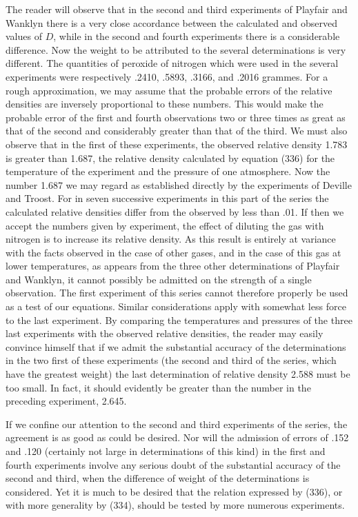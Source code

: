 \documentclass[12pt]{article}
\begin{document}
The reader will observe that in the second and third experiments of Playfair and Wanklyn there is a very close accordance between the calculated and observed values of $D$, while in the second and fourth experiments there is a considerable difference. Now the weight to be attributed to the several determinations is very different. The quantities of peroxide of nitrogen which were used in the several experiments were respectively .2410, .5893, .3166, and .2016 grammes. For a rough approximation, we may assume that the probable errors of the relative densities are inversely proportional to these numbers. This would make the probable error of the first and fourth observations two or three times as great as that of the second and considerably greater than that of the third. We must also observe that in the first of these experiments, the observed relative density 1.783 is greater than 1.687, the relative density calculated by equation (336) for the temperature of the experiment and the pressure of one atmosphere. Now the number 1.687 we may regard as established directly by the experiments of Deville and Troost. For in seven successive experiments in this part of the series the calculated relative densities differ from the observed by less than .01. If then we accept the numbers given by experiment, the effect of diluting the gas with nitrogen is to increase its relative density. As this result is entirely at variance with the facts observed in the case of other gases, and in the case of this gas at lower temperatures, as appears from the three other determinations of Playfair and Wanklyn, it cannot possibly be admitted on the strength of a single observation. The first experiment of this series cannot therefore properly be used as a test of our equations. Similar considerations apply with somewhat less force to the last experiment. By comparing the temperatures and pressures of the three last experiments with the observed relative densities, the reader may easily convince himself that if we admit the substantial accuracy of the determinations in the two first of these experiments (the second and third of the series, which have the greatest weight) the last determination of relative density 2.588 must be too small. In fact, it should evidently be greater than the number in the preceding experiment, 2.645.

If we confine our attention to the second and third experiments of the series, the agreement is as good as could be desired. Nor will the admission of errors of .152 and .120 (certainly not large in determinations of this kind) in the first and fourth experiments involve any serious doubt of the substantial accuracy of the second and third, when the difference of weight of the determinations is considered. Yet it is much to be desired that the relation expressed by (336), or with more generality by (334), should be tested by more numerous experiments.
\end{document}
